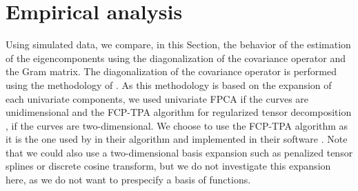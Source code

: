 \section{Empirical analysis} %
\label{sec:empirical_analysis}

Using simulated data, we compare, in this Section, the behavior of the estimation of the eigencomponents using the diagonalization of the covariance operator and the Gram matrix. The diagonalization of the covariance operator is performed using the methodology of \cite{happMultivariateFunctionalPrincipal2018a}. As this methodology is based on the expansion of each univariate components, we used univariate FPCA if the curves are unidimensional and the FCP-TPA algorithm for regularized tensor decomposition \citep{allenMultiwayFunctionalPrincipal2013a}, if the curves are two-dimensional. We choose to use the FCP-TPA algorithm as it is the one used by \cite{happMultivariateFunctionalPrincipal2018a} in their algorithm and implemented in their software \citep{happ-kurzObjectOrientedSoftwareFunctional2020}. Note that we could also use a two-dimensional basis expansion such as penalized tensor splines or discrete cosine transform, but we do not investigate this expansion here, as we do not want to prespecify a basis of functions.

